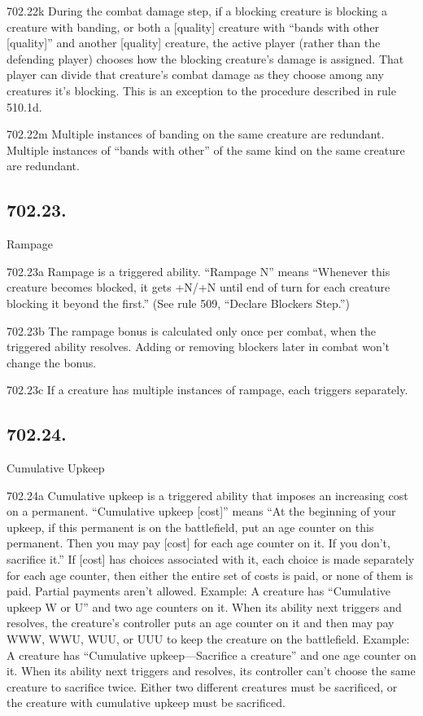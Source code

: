702.22k During the combat damage step, if a blocking creature is blocking a creature with banding, or both a [quality] creature with “bands with other [quality]” and another [quality] creature, the active player (rather than the defending player) chooses how the blocking creature’s damage is assigned. That player can divide that creature’s combat damage as they choose among any creatures it’s blocking. This is an exception to the procedure described in rule 510.1d.

702.22m Multiple instances of banding on the same creature are redundant. Multiple instances of “bands with other” of the same kind on the same creature are redundant.

\subsection*{702.23.}
Rampage

702.23a Rampage is a triggered ability. “Rampage N” means “Whenever this creature becomes blocked, it gets +N/+N until end of turn for each creature blocking it beyond the first.” (See rule 509, “Declare Blockers Step.”)

702.23b The rampage bonus is calculated only once per combat, when the triggered ability resolves. Adding or removing blockers later in combat won’t change the bonus.

702.23c If a creature has multiple instances of rampage, each triggers separately.

\subsection*{702.24.}
Cumulative Upkeep

702.24a Cumulative upkeep is a triggered ability that imposes an increasing cost on a permanent. “Cumulative upkeep [cost]” means “At the beginning of your upkeep, if this permanent is on the battlefield, put an age counter on this permanent. Then you may pay [cost] for each age counter on it. If you don’t, sacrifice it.” If [cost] has choices associated with it, each choice is made separately for each age counter, then either the entire set of costs is paid, or none of them is paid. Partial payments aren’t allowed.
Example: A creature has “Cumulative upkeep {W} or {U}” and two age counters on it. When its ability next triggers and resolves, the creature’s controller puts an age counter on it and then may pay {W}{W}{W}, {W}{W}{U}, {W}{U}{U}, or {U}{U}{U} to keep the creature on the battlefield.
Example: A creature has “Cumulative upkeep—Sacrifice a creature” and one age counter on it. When its ability next triggers and resolves, its controller can’t choose the same creature to sacrifice twice. Either two different creatures must be sacrificed, or the creature with cumulative upkeep must be sacrificed.

